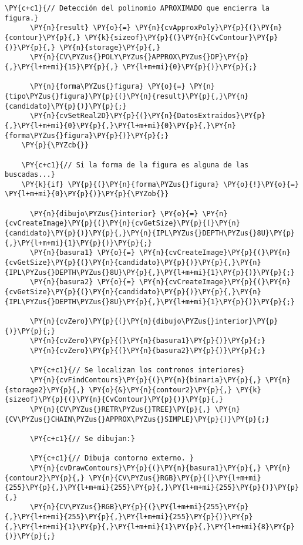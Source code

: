 \begin{Verbatim}[commandchars=\\\{\}]
      \PY{c+c1}{// Detección del polinomio APROXIMADO que encierra la figura.}
      \PY{n}{result} \PY{o}{=} \PY{n}{cvApproxPoly}\PY{p}{(}\PY{n}{contour}\PY{p}{,} \PY{k}{sizeof}\PY{p}{(}\PY{n}{CvContour}\PY{p}{)}\PY{p}{,} \PY{n}{storage}\PY{p}{,} 
      \PY{n}{CV\PYZus{}POLY\PYZus{}APPROX\PYZus{}DP}\PY{p}{,}\PY{l+m+mi}{15}\PY{p}{,} \PY{l+m+mi}{0}\PY{p}{)}\PY{p}{;}
      
      \PY{n}{forma\PYZus{}figura} \PY{o}{=} \PY{n}{tipo\PYZus{}figura}\PY{p}{(}\PY{n}{result}\PY{p}{,}\PY{n}{candidato}\PY{p}{)}\PY{p}{;}
      \PY{n}{cvSetReal2D}\PY{p}{(}\PY{n}{DatosExtraidos}\PY{p}{,}\PY{l+m+mi}{0}\PY{p}{,}\PY{l+m+mi}{0}\PY{p}{,}\PY{n}{forma\PYZus{}figura}\PY{p}{)}\PY{p}{;}
    \PY{p}{\PYZcb{}}

    \PY{c+c1}{// Si la forma de la figura es alguna de las buscadas...}
    \PY{k}{if} \PY{p}{(}\PY{n}{forma\PYZus{}figura} \PY{o}{!}\PY{o}{=} \PY{l+m+mi}{0}\PY{p}{)}\PY{p}{\PYZob{}} 
      
      \PY{n}{dibujo\PYZus{}interior} \PY{o}{=} \PY{n}{cvCreateImage}\PY{p}{(}\PY{n}{cvGetSize}\PY{p}{(}\PY{n}{candidato}\PY{p}{)}\PY{p}{,}\PY{n}{IPL\PYZus{}DEPTH\PYZus{}8U}\PY{p}{,}\PY{l+m+mi}{1}\PY{p}{)}\PY{p}{;}
      \PY{n}{basura1} \PY{o}{=} \PY{n}{cvCreateImage}\PY{p}{(}\PY{n}{cvGetSize}\PY{p}{(}\PY{n}{candidato}\PY{p}{)}\PY{p}{,}\PY{n}{IPL\PYZus{}DEPTH\PYZus{}8U}\PY{p}{,}\PY{l+m+mi}{1}\PY{p}{)}\PY{p}{;}
      \PY{n}{basura2} \PY{o}{=} \PY{n}{cvCreateImage}\PY{p}{(}\PY{n}{cvGetSize}\PY{p}{(}\PY{n}{candidato}\PY{p}{)}\PY{p}{,}\PY{n}{IPL\PYZus{}DEPTH\PYZus{}8U}\PY{p}{,}\PY{l+m+mi}{1}\PY{p}{)}\PY{p}{;}
      
      \PY{n}{cvZero}\PY{p}{(}\PY{n}{dibujo\PYZus{}interior}\PY{p}{)}\PY{p}{;}
      \PY{n}{cvZero}\PY{p}{(}\PY{n}{basura1}\PY{p}{)}\PY{p}{;}
      \PY{n}{cvZero}\PY{p}{(}\PY{n}{basura2}\PY{p}{)}\PY{p}{;}
      
      \PY{c+c1}{// Se localizan los contronos interiores}
      \PY{n}{cvFindContours}\PY{p}{(}\PY{n}{binaria}\PY{p}{,} \PY{n}{storage2}\PY{p}{,} \PY{o}{&}\PY{n}{contour2}\PY{p}{,} \PY{k}{sizeof}\PY{p}{(}\PY{n}{CvContour}\PY{p}{)}\PY{p}{,}
      \PY{n}{CV\PYZus{}RETR\PYZus{}TREE}\PY{p}{,} \PY{n}{CV\PYZus{}CHAIN\PYZus{}APPROX\PYZus{}SIMPLE}\PY{p}{)}\PY{p}{;}
      
      \PY{c+c1}{// Se dibujan:}
      
      \PY{c+c1}{// Dibuja contorno externo.	}
      \PY{n}{cvDrawContours}\PY{p}{(}\PY{n}{basura1}\PY{p}{,} \PY{n}{contour2}\PY{p}{,} \PY{n}{CV\PYZus{}RGB}\PY{p}{(}\PY{l+m+mi}{255}\PY{p}{,}\PY{l+m+mi}{255}\PY{p}{,}\PY{l+m+mi}{255}\PY{p}{)}\PY{p}{,}
      \PY{n}{CV\PYZus{}RGB}\PY{p}{(}\PY{l+m+mi}{255}\PY{p}{,}\PY{l+m+mi}{255}\PY{p}{,}\PY{l+m+mi}{255}\PY{p}{)}\PY{p}{,}\PY{l+m+mi}{1}\PY{p}{,}\PY{l+m+mi}{1}\PY{p}{,}\PY{l+m+mi}{8}\PY{p}{)}\PY{p}{;} 


\end{Verbatim}
